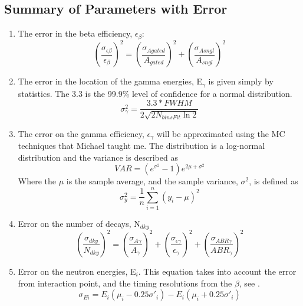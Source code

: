 \subsection{Summary of Parameters with Error}
\begin{enumerate}
\item The error in the beta efficiency, $\epsilon_\beta$:
  \begin{equation}
    \left(\frac{\sigma_{\epsilon\beta}}{\epsilon_\beta}\right)^2 = 
    \left(\frac{\sigma_{Agated}}{A_{gated}}\right)^2 + 
    \left(\frac{\sigma_{Asngl}}{A_{sngl}}\right)^2
    \label{eqn:errBeta}
  \end{equation}
\item The error in the location of the gamma energies, E$_\gamma$ is given 
  simply by statistics. The 3.3 is the 99.9\% level of confidence for a 
  normal distribution.
  \begin{equation}
    \sigma_{\gamma}^2 = \frac{3.3 * FWHM}{2\sqrt{2N_{binsFit}\ln{2}}}
    \label{eqn:errGammaEn}
  \end{equation}
\item The error on the gamma efficiency, $\epsilon_\gamma$ will be approximated 
  using the MC techniques that Michael taught me. The distribution is a 
  log-normal distribution and the variance is described as
  \begin{equation}
    VAR = (e^{\sigma^2} - 1) e^{2\mu+\sigma^2}
    \label{eqn:logNormalVariance}
  \end{equation}
  Where the $\mu$ is the sample average, and the sample variance, $\sigma^2$,
  is defined as
    \begin{equation}
    \sigma_y^2 = \frac{1}{n}\sum_{i=1}^n(y_i-\mu)^2
    \label{eqn:sampleVariance}
  \end{equation}
\item Error on the number of decays, N$_{dky}$
  \begin{equation}
    \left(\frac{\sigma_{dky}}{N_{dky}}\right)^2 = 
    \left(\frac{\sigma_{A\gamma}}{A_\gamma}\right)^2 + 
    \left(\frac{\sigma_{\epsilon\gamma}}{\epsilon_\gamma}\right)^2 +
    \left(\frac{\sigma_{ABR\gamma}}{ABR_\gamma}\right)^2
    \label{eqn:errNdky}
  \end{equation}
\item Error on the neutron energies, E$_i$. This equation takes into account 
  the error from interaction point, and the timing resolutions from the 
  $\beta$, see \cite{kornilov2009}.
  \begin{equation}
    \sigma_{Ei} = E_i(\mu_i - 0.25\sigma'_i) - E_i(\mu_i + 0.25\sigma'_i)

\end{equation}
\end{enumerate}
